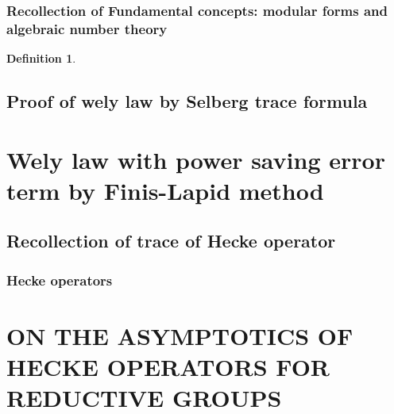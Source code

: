 \documentclass[12pt,a4paper,english]{article}
\theoremstyle{plain}
\theoremstyle{definition}
\newtheorem{defi}{Definition}
\theoremstyle{remark}
\begin{document}
\subsubsection{Recollection of Fundamental concepts: modular forms and algebraic number theory}
\begin{defi}

\end{defi}
\subsection{Proof of wely law by Selberg trace formula}
\section{Wely law with power saving error term by Finis-Lapid method}
\subsection{Recollection of trace of Hecke operator}
\subsubsection{Hecke operators}
\section{ON THE ASYMPTOTICS OF HECKE OPERATORS FOR REDUCTIVE
GROUPS}
\end{document}
